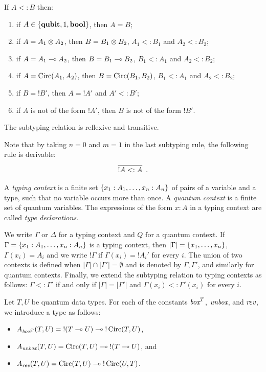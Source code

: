 \documentclass[twoside]{article}
\begin{document}
\begin{remark}
\label{subtyping_shape}
If $A<:B$ then:
\begin{enumerate}
  \item if $A\in\{\textrm{\bf qubit}, 1, \textrm{\bf bool}\}$, then $A=B$;
  \item if $A=A_1\otimes A_2$, then $B=B_1\otimes B_2$, 
  $A_1<:B_1$ and $A_2<:B_2$;
  \item if $A=A_1\multimap A_2$, then $B=B_1\multimap B_2$, 
  $B_1<:A_1$ and $A_2<:B_2$;
  \item if $A=\mathop{\textrm{Circ}}\nolimits(A_1, A_2)$, then $B=\mathop{\textrm{Circ}}\nolimits(B_1,B_2)$, 
  $B_1<:A_1$ and $A_2<:B_2$;
  \item if $B={!}B'$, then $A={!}A'$ and $A'<:B'$;\label{subtype_bang}
  \item if $A$ is not of the form ${!}A'$, then $B$ is not 
  of the form ${!}B'$.
\end{enumerate}
\end{remark}

\begin{proposition}
The subtyping relation is reflexive and transitive.
\end{proposition}

Note that by taking $n=0$ and $m=1$ in the last subtyping rule, the
following rule is derivable:
\[
  \infer[]{{!}A <: A}{}
  .
\]

\begin{definition}
A \emph{typing context} is a finite set 
$\{x_1:A_1,\ldots,x_n:A_n\}$ of pairs of a variable and 
a type, such that no variable occurs more than once. A 
\emph{quantum context} is a finite set of quantum variables. 
The expressions of the form $x:A$ in a typing context are 
called \emph{type declarations}.	
\end{definition}

We write $\Gamma$ or $\Delta$ for a typing context and $Q$ for 
a quantum context. If $\Gamma =\{x_1:A_1,\ldots,x_n:A_n\}$ is 
a typing context, then $|\Gamma|=\{x_1,\ldots,x_n\}$, 
$\Gamma (x_i)=A_i$ and we write ${!}\Gamma$ if $\Gamma(x_i)={!}A_i'$ 
for every $i$. The union of two contexts is defined when
$|\Gamma|\cap  |\Gamma'|=\emptyset$ and is denoted by $\Gamma,\Gamma'$, 
and similarly for quantum contexts. Finally, we extend the subtyping 
relation to typing contexts as follows: $\Gamma <: \Gamma'$ if and 
only if $|\Gamma | = |\Gamma'|$ and $\Gamma (x_i)<: \Gamma' (x_i)$ 
for every $i$.

\begin{definition}
Let $T,U$ be quantum data types. For each of the constants 
$\mathop{\textit{box}}\nolimits^T$, $\mathop{\textit{unbox}}\nolimits$, and $\mathop{\textit{rev}}\nolimits$, we introduce a type as follows:
\begin{itemize}
  \item $A_{\mathop{\textit{box}}\nolimits^T}(T,U)={!}(T\multimap U)\multimap {!}\mathop{\textrm{Circ}}\nolimits(T,U)$,
  \item $A_{\mathop{\textit{unbox}}\nolimits}(T,U)=\mathop{\textrm{Circ}}\nolimits(T,U)\multimap {!}(T\multimap U)$, and
  \item $A_{\mathop{\textit{rev}}\nolimits}(T,U)=\mathop{\textrm{Circ}}\nolimits(T,U) \multimap {!}\mathop{\textrm{Circ}}\nolimits(U,T)$.
\end{itemize}
\end{definition}
\end{document}
